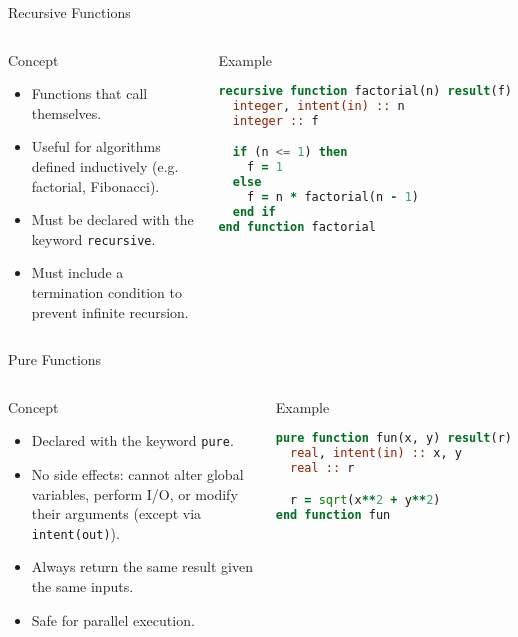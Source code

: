 \begin{frame}[fragile]{Recursive Functions}
  \begin{columns}[T]
    \begin{block}{Concept}
      \begin{itemize}
        \item Functions that call themselves.
        \item Useful for algorithms defined inductively
              (e.g. factorial, Fibonacci).
        \item Must be declared with the keyword
              \texttt{recursive}.
        \item Must include a termination condition to
              prevent infinite recursion.
      \end{itemize}
    \end{block}

    \begin{block}{Example}
\begin{lstlisting}[language=Fortran]
recursive function factorial(n) result(f)
  integer, intent(in) :: n
  integer :: f

  if (n <= 1) then
    f = 1
  else
    f = n * factorial(n - 1)
  end if
end function factorial
\end{lstlisting}
    \end{block}
  \end{columns}
\end{frame}

\begin{frame}[fragile]{Pure Functions}
  \begin{columns}[T]
    \begin{block}{Concept}
      \begin{itemize}
        \item Declared with the keyword \texttt{pure}.
        \item No side effects: cannot alter global variables,
              perform I/O, or modify their arguments
              (except via \texttt{intent(out)}).
        \item Always return the same result given the same
              inputs.
        \item Safe for parallel execution.
      \end{itemize}
    \end{block}

    \begin{block}{Example}
\begin{lstlisting}[language=Fortran]
pure function fun(x, y) result(r)
  real, intent(in) :: x, y
  real :: r

  r = sqrt(x**2 + y**2)
end function fun
\end{lstlisting}
    \end{block}
  \end{columns}
\end{frame}

